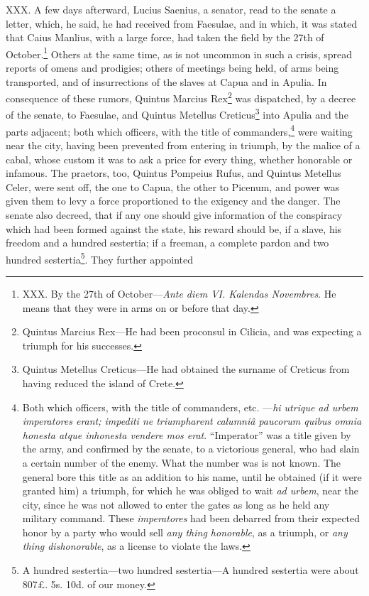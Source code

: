 XXX. A few days afterward, Lucius Saenius, a senator, read to the
senate a letter, which, he said, he had received from Faesulae, and in
which, it was stated that Caius Manlius, with a large force, had taken
the field by the 27th of October.\footnote{XXX. By the 27th of October—\emph{Ante diem VI. Kalendas
Novembres}. He means that they were in arms on or before that day.} Others at the same time, as is
not uncommon in such a crisis, spread reports of omens and prodigies;
others of meetings being held, of arms being transported, and of
insurrections of the slaves at Capua and in Apulia. In consequence of
these rumors, Quintus Marcius Rex\footnote{Quintus Marcius Rex—He had been proconsul in Cilicia, and
was expecting a triumph for his successes.} was dispatched, by a decree of
the senate, to Faesulae, and Quintus Metellus Creticus\footnote{Quintus Metellus Creticus—He had obtained the surname of
Creticus from having reduced the island of Crete.} into
Apulia and the parts adjacent; both which officers, with the title of
commanders,\footnote{Both which officers, with the title of commanders, etc.
—\emph{hi utrique ad urbem imperatores erant; impediti ne triumpharent
calumniâ paucorum quibus omnia honesta atque inhonesta vendere mos
erat}. ``Imperator'' was a title given by the army, and confirmed by the
senate, to a victorious general, who had slain a certain number of the
enemy. What the number was is not known. The general bore this title
as an addition to his name, until he obtained (if it were granted him)
a triumph, for which he was obliged to wait \emph{ad urbem}, near the city,
since he was not allowed to enter the gates as long as he held any
military command. These \emph{imperatores} had been debarred from their
expected honor by a party who would sell \emph{any thing honorable}, as a
triumph, or \emph{any thing dishonorable}, as a license to violate the laws.} were waiting near the city, having been prevented
from entering in triumph, by the malice of a cabal, whose custom it
was to ask a price for every thing, whether honorable or infamous. The
praetors, too, Quintus Pompeius Rufus, and Quintus Metellus Celer, were
sent off, the one to Capua, the other to Picenum, and power was given
them to levy a force proportioned to the exigency and the danger. The
senate also decreed, that if any one should give information of the
conspiracy which had been formed against the state, his reward should
be, if a slave, his freedom and a hundred sestertia; if a freeman, a
complete pardon and two hundred sestertia\footnote{A hundred sestertia—two hundred sestertia—A hundred sestertia
were about 807£. 5s. 10d. of our money.}. They further appointed
